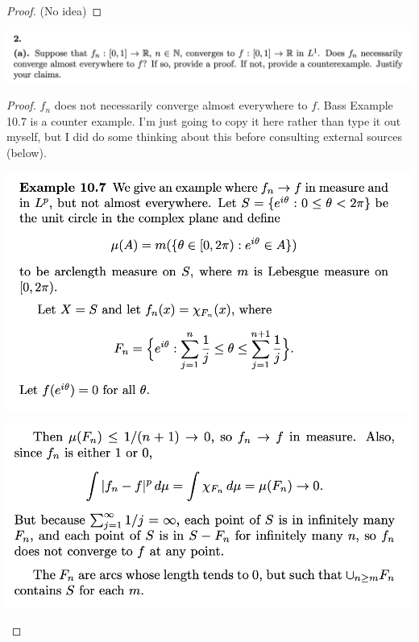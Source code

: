 
\begin{proof}
   (No idea)
\end{proof}

\newpage
\begin{mdframed}
  \includegraphics[width=400pt]{img/analysis--berkeley-202a-final-04b9.png}
\end{mdframed}

\begin{proof}
  $f_n$ does not necessarily converge almost everywhere to $f$. Bass Example 10.7 is a counter example. I'm
  just going to copy it here rather than type it out myself, but I did do some thinking about this before
  consulting external sources (below).
  \begin{mdframed}
    \includegraphics[width=400pt]{img/analysis--berkeley-202a-final-35f7.png}\\
    \includegraphics[width=400pt]{img/analysis--berkeley-202a-final-07d9.png}
  \end{mdframed}
\end{proof}


